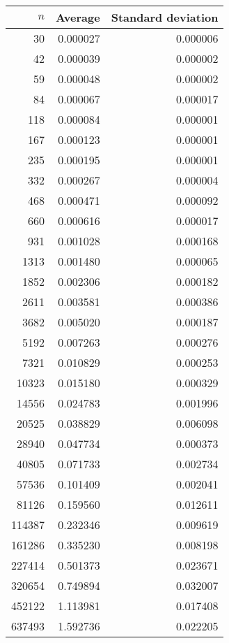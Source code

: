 \begin{tabular}{rrr}
$n$ & Average & Standard deviation\\\hline
30 & 0.000027 & 0.000006\\
42 & 0.000039 & 0.000002\\
59 & 0.000048 & 0.000002\\
84 & 0.000067 & 0.000017\\
118 & 0.000084 & 0.000001\\
167 & 0.000123 & 0.000001\\
235 & 0.000195 & 0.000001\\
332 & 0.000267 & 0.000004\\
468 & 0.000471 & 0.000092\\
660 & 0.000616 & 0.000017\\
931 & 0.001028 & 0.000168\\
1313 & 0.001480 & 0.000065\\
1852 & 0.002306 & 0.000182\\
2611 & 0.003581 & 0.000386\\
3682 & 0.005020 & 0.000187\\
5192 & 0.007263 & 0.000276\\
7321 & 0.010829 & 0.000253\\
10323 & 0.015180 & 0.000329\\
14556 & 0.024783 & 0.001996\\
20525 & 0.038829 & 0.006098\\
28940 & 0.047734 & 0.000373\\
40805 & 0.071733 & 0.002734\\
57536 & 0.101409 & 0.002041\\
81126 & 0.159560 & 0.012611\\
114387 & 0.232346 & 0.009619\\
161286 & 0.335230 & 0.008198\\
227414 & 0.501373 & 0.023671\\
320654 & 0.749894 & 0.032007\\
452122 & 1.113981 & 0.017408\\
637493 & 1.592736 & 0.022205\\
\end{tabular}
